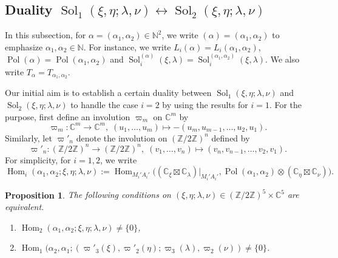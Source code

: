 \documentclass[a4paper,11pt,reqno]{amsart}
\newcommand{\CC}{\mathbb{C}}
\newcommand{\0}{{\bf 0}}
\newcommand{\N}{\mathbb{N}}
\newcommand{\Z}{\mathbb{Z}}
\newcommand{\C}{\mathbb{C}}
\newcommand{\1}{{\bf 1}}
\DeclareMathOperator{\Hom}{Hom}
\DeclareMathOperator{\Pol}{Pol}
\DeclareMathOperator{\Sol}{Sol}
\theoremstyle{plain}
\newtheorem{proposition}[equation]{Proposition}
\theoremstyle{definition}
\numberwithin{equation}{section}
\theoremstyle{definition}
\begin{document}
\subsection{Duality \texorpdfstring{$\Sol_1(\xi,\eta; \lambda,\nu)
\leftrightarrow \Sol_2(\xi,\eta; \lambda,\nu)$}{Sol_1 -> Sol_2}}
\label{sec:duality}

In this subsection,  for $\alpha=(\alpha_1,\alpha_2) \in \N^2$,
we write $(\alpha)=(\alpha_1,\alpha_2)$ to emphasize $\alpha_1, \alpha_2 \in \N$.
For instance, we write $L_i(\alpha)=L_i(\alpha_1, \alpha_2)$,
$\Pol(\alpha)=\Pol(\alpha_1,\alpha_2)$ and 
$\Sol^{(\alpha)}_i(\xi,\lambda) = \Sol^{(\alpha_1,\alpha_2)}_i(\xi,\lambda)$.
We also write $T_\alpha = T_{\alpha_1,\alpha_2}$.

Our initial aim is to establish a certain duality between 
$\Sol_1(\xi,\eta; \lambda,\nu)$ and $\Sol_2(\xi,\eta; \lambda,\nu)$
to handle the case $i=2$ by using the results for $i=1$.
For the purpose, first define an involution $\varpi_m$ on $\C^m$ by
\begin{equation*}
\varpi_m: \C^m \rightarrow \C^m, \; 
(u_1, \ldots, u_m) \mapsto -(u_m, u_{m-1}, \dots, u_2, u_1).
\end{equation*}
Similarly, let  $\varpi'_n$ denote the involution on $(\Z/2\Z)^n$ defined by
\begin{equation*}
\varpi'_n: (\Z/2\Z)^n \rightarrow (\Z/2\Z)^n, \; 
 (v_1, \ldots, v_n) \mapsto (v_n, v_{n-1}, \dots, v_2, v_1).
\end{equation*}
For simplicity, for $i=1,2$, we write
\begin{equation*}
\Hom_i(\alpha_1,\alpha_2;\xi,\eta; \lambda,\nu):=
\Hom_{M_i'A_i'}\big((\CC_\xi\boxtimes \CC_{\lambda})\big\rvert_{M_i'A_i'},
\Pol(\alpha_1,\alpha_2)\otimes (\CC_\eta\boxtimes \CC_{\nu})\big).
\end{equation*}

\begin{proposition}\label{prop:Hom12}
The following conditions 
on $(\xi,\eta; \lambda,\nu) \in (\Z/2\Z)^5\times \C^5$ are equivalent.
\begin{enumerate}[label=\normalfont{(\roman*)}]
\item
$\Hom_2(\alpha_1,\alpha_2;\xi,\eta; \lambda,\nu)\neq \{0\}$,
\vspace{3pt}

\item 
$\Hom_1(\alpha_2,\alpha_1;(\varpi'_3(\xi), \varpi'_2(\eta); \varpi_3(\lambda), \varpi_2(\nu))\neq \{0\}$.
\end{enumerate}

\end{proposition}
\end{document}
